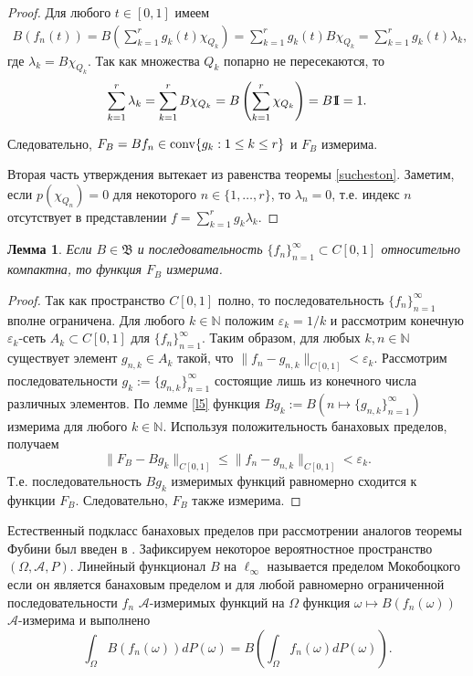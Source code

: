 \documentclass[12pt]{article}
\newcommand{\emm}{\mathrm{1\hspace{-0.3em} I}}
\newtheorem{lem}[thm]{Лемма}
\def\N{{\mathbb{N}}}
\def\B{{\mathfrak{B}}}
\begin{document}
\begin{proof}
Для любого $t\in[0,1]$ имеем
\begin{align*}
B(f_n(t))= B\left(\sum_{k=1}^r g_k(t) \chi_{Q_k}\right)= \sum_{k=1}^r g_k(t) B\chi_{Q_k}= \sum_{k=1}^r g_k(t) \lambda_k,
\end{align*}
где $\lambda_k=B\chi_{Q_k}.$ Так как множества $Q_k$ попарно не пересекаются, то
\begin{align*}
\sum_{k=1}^r \lambda_k= \sum_{k=1}^r B\chi_{Q_k}= B\left(\sum_{k=1}^r \chi_{Q_k}\right)=B\emm=1.
\end{align*}

Следовательно, $F_B=Bf_n\in {\rm conv} \{g_k : 1\le k \le r\}$ и $F_B$ измерима.

Вторая часть утверждения вытекает из равенства теоремы \ref{sucheston}. Заметим, если $p(\chi_{Q_n})=0$ для некоторого $n\in \{1, \dots, r\}$, то $\lambda_n=0$, т.е. индекс $n$ отсутствует в представлении $f=\sum_{k=1}^r g_k\lambda_k$.

\end{proof}


\begin{lem}\label{l6}
Если $B\in \B$ и последовательность $\{f_n\}_{n=1}^\infty \subset C[0,1]$  относительно компактна, то функция $F_B$ измерима.
\end{lem}

\begin{proof}
Так как пространство $C[0,1]$ полно, то последовательность $\{f_n\}_{n=1}^\infty$ вполне ограничена. Для любого $k\in\N$ положим $\varepsilon_k=1/k$ и рассмотрим конечную $\varepsilon_k$-сеть $A_k\subset C[0,1]$ для $\{f_n\}_{n=1}^\infty$. Таким образом, для любых $k, n\in\N$ существует элемент $g_{n,k}\in A_k$ такой, что $\|f_n-g_{n,k}\|_{C[0,1]}<\varepsilon_k.$ Рассмотрим последовательности $g_k:=\{g_{n,k}\}_{n=1}^\infty$ состоящие лишь из конечного числа различных  элементов. По лемме \ref{l5} функция $Bg_k:= B(n\mapsto \{g_{n,k}\}_{n=1}^\infty)$ измерима для любого $k\in \N.$ Используя положительность банаховых пределов, получаем
$$\|F_B-Bg_{k}\|_{C[0,1]}\le\|f_n-g_{n,k}\|_{C[0,1]}<\varepsilon_k.$$
Т.е. последовательность $Bg_k$ измеримых функций равномерно сходится к функции $F_B$. Следовательно, $F_B$ также измерима.
\end{proof}

Естественный подкласс банаховых пределов при рассмотрении аналогов теоремы Фубини был введен в \cite{Mokobodzki}.
Зафиксируем некоторое вероятностное пространство $(\Omega, \mathcal A, P)$. Линейный функционал $B$ на $\ell_\infty$ называется пределом Мокобоцкого если он является банаховым пределом и для любой равномерно ограниченной последовательности $f_n$  $\mathcal A$-измеримых функций на $\Omega$ функция $\omega \mapsto B(f_n(\omega))$ $\mathcal A$-измерима и выполнено
\begin{equation}\label{Fubini1}
\int_\Omega B(f_n(\omega)) dP(\omega) = B\left(\int_\Omega f_n(\omega) dP(\omega)\right).
 \end{equation}
\end{document}
